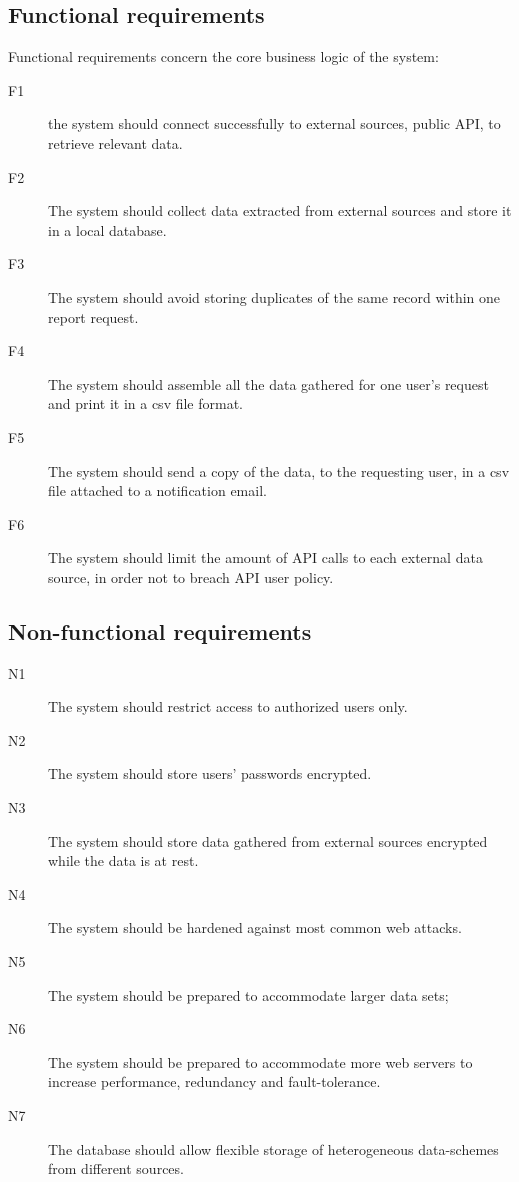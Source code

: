 \subsection{Functional requirements}
Functional requirements concern the core business logic of the system:
\begin{description}
\item[F1] the system should connect successfully to external sources, public
API, to retrieve relevant data.
\item[F2] The system should collect data extracted from external sources and
store it in a local database.
\item[F3] The system should avoid storing duplicates of the same record within
one report request.
\item[F4] The system should assemble all the data gathered for one user's
request and print it in a csv file format.
\item[F5] The system should send a copy of the data, to the requesting user, in
a csv file attached to a notification email.
\item[F6] The system should limit the amount of API calls to each external data
source, in order not to breach API user policy.
\end{description}

\subsection{Non-functional requirements}

\begin{description}
  \item[N1] The system should restrict access to authorized users only.
  \item[N2] The system should store users' passwords encrypted.
  \item[N3] The system should store data gathered from external sources
  encrypted while the data is at rest.
  \item[N4] The system should be hardened against most common web attacks.
  \item[N5] The system should be prepared to accommodate larger data
  sets;
  \item[N6] The system should be prepared to accommodate more web servers to
  increase performance, redundancy and fault-tolerance.
  \item[N7] The database should allow flexible storage of heterogeneous
  data-schemes from different sources.
\end{description}

